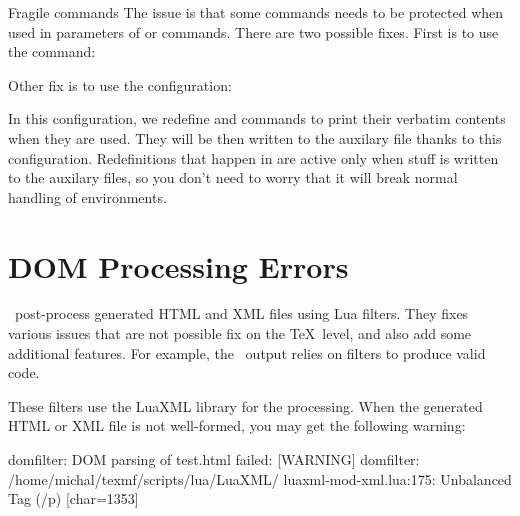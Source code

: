 \begin{issue}{Fragile commands}
The issue is that some commands needs to be protected when used in parameters of \texcommand{\section}
or \texcommand{\caption} commands. There are two possible fixes. First is to use the \texcommand{\protect}
command:

\begin{texsource}
\caption{$\protect\begin{array}{c c} hello & world\protect\end{array}$}
\end{texsource}

Other fix is to use the  configuration:

\begin{texsource}
\end{texsource}

In this configuration, we redefine \texcommand{\begin} and \texcommand{\end} commands to print
their verbatim contents when they are used. They will be then written to the auxilary file
thanks to this configuration.
Redefinitions that happen in  are active only when stuff is written to the auxilary
files, so you don't need to worry that it will break normal handling of environments.

\end{issue}

\section{DOM Processing Errors}
\label{faq:dom_processing}

\texfourht\ post-process generated HTML and XML files using Lua filters. They fixes various issues that
are not possible fix on the \TeX\ level, and also add some additional features. For example, the \mathml\ 
output relies on filters to produce valid code.

These filters use the LuaXML library for the processing. When the generated HTML or XML file is not well-formed,
you may get the following warning:


\begin{shellcommand}
[WARNING] domfilter: DOM parsing of test.html failed:
[WARNING] domfilter: /home/michal/texmf/scripts/lua/LuaXML/
luaxml-mod-xml.lua:175: Unbalanced Tag (/p) [char=1353]
\end{shellcommand}

